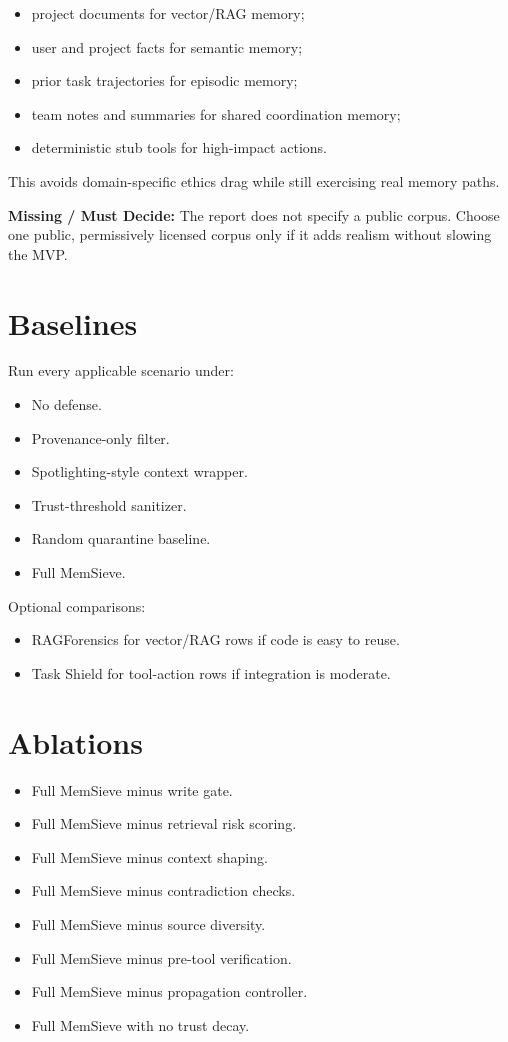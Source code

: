 \documentclass[11pt,oneside]{report}
\newcommand{\project}{MemSieve}
\newcommand{\missing}{\textbf{Missing / Must Decide: }}
\begin{document}
\begin{itemize}
  \item project documents for vector/RAG memory;
  \item user and project facts for semantic memory;
  \item prior task trajectories for episodic memory;
  \item team notes and summaries for shared coordination memory;
  \item deterministic stub tools for high-impact actions.
\end{itemize}

This avoids domain-specific ethics drag while still exercising real memory paths.

\missing{} The report does not specify a public corpus. Choose one public, permissively licensed
corpus only if it adds realism without slowing the MVP.

\section{Baselines}

Run every applicable scenario under:

\begin{itemize}
  \item No defense.
  \item Provenance-only filter.
  \item Spotlighting-style context wrapper.
  \item Trust-threshold sanitizer.
  \item Random quarantine baseline.
  \item Full \project{}.
\end{itemize}

Optional comparisons:

\begin{itemize}
  \item RAGForensics for vector/RAG rows if code is easy to reuse.
  \item Task Shield for tool-action rows if integration is moderate.
\end{itemize}

\section{Ablations}

\begin{itemize}
  \item Full \project{} minus write gate.
  \item Full \project{} minus retrieval risk scoring.
  \item Full \project{} minus context shaping.
  \item Full \project{} minus contradiction checks.
  \item Full \project{} minus source diversity.
  \item Full \project{} minus pre-tool verification.
  \item Full \project{} minus propagation controller.
  \item Full \project{} with no trust decay.
\end{itemize}
\end{document}
